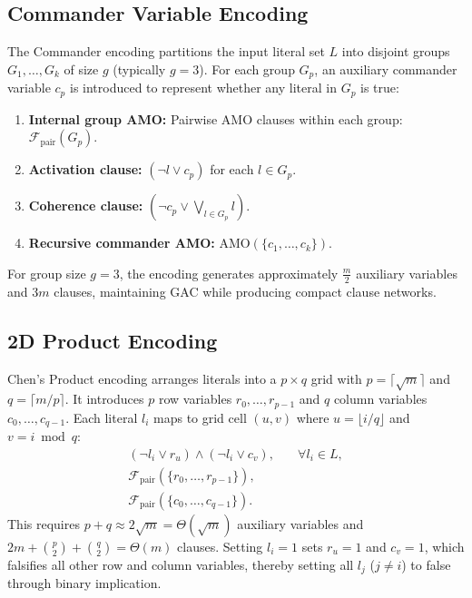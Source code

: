 \documentclass[a4paper,fleqn]{cas-sc}
\begin{document}
\subsection{Commander Variable Encoding}
The Commander encoding \citep{klieber2007commander} partitions the input literal set $L$ into disjoint groups $G_1, \dots, G_k$ of size $g$ (typically $g = 3$). For each group $G_p$, an auxiliary commander variable $c_p$ is introduced to represent whether any literal in $G_p$ is true:
\begin{enumerate}
    \item \textbf{Internal group AMO:} Pairwise AMO clauses within each group: $\mathcal{F}_{\text{pair}}(G_p)$.
    \item \textbf{Activation clause:} $(\neg l \lor c_p)$ for each $l \in G_p$.
    \item \textbf{Coherence clause:} $(\neg c_p \lor \bigvee_{l \in G_p} l)$.
    \item \textbf{Recursive commander AMO:} $\text{AMO}(\{c_1, \dots, c_k\})$.
\end{enumerate}
For group size $g = 3$, the encoding generates approximately $\frac{m}{2}$ auxiliary variables and $3m$ clauses, maintaining GAC while producing compact clause networks.

\subsection{2D Product Encoding}
Chen's Product encoding \citep{chen2010product} arranges literals into a $p \times q$ grid with $p = \lceil\sqrt{m}\rceil$ and $q = \lceil m/p \rceil$. It introduces $p$ row variables $r_0, \dots, r_{p-1}$ and $q$ column variables $c_0, \dots, c_{q-1}$. Each literal $l_i$ maps to grid cell $(u, v)$ where $u = \lfloor i/q \rfloor$ and $v = i \bmod q$:
\begin{align}
    (\neg l_i \lor r_u) \land (\neg l_i \lor c_v), & \quad \forall l_i \in L, \\
    \mathcal{F}_{\text{pair}}(\{r_0, \dots, r_{p-1}\}), & \\
    \mathcal{F}_{\text{pair}}(\{c_0, \dots, c_{q-1}\}). &
\end{align}
This requires $p + q \approx 2\sqrt{m} = \Theta(\sqrt{m})$ auxiliary variables and $2m + \binom{p}{2} + \binom{q}{2} = \Theta(m)$ clauses. Setting $l_i = 1$ sets $r_u = 1$ and $c_v = 1$, which falsifies all other row and column variables, thereby setting all $l_j$ ($j \ne i$) to false through binary implication.
\end{document}
